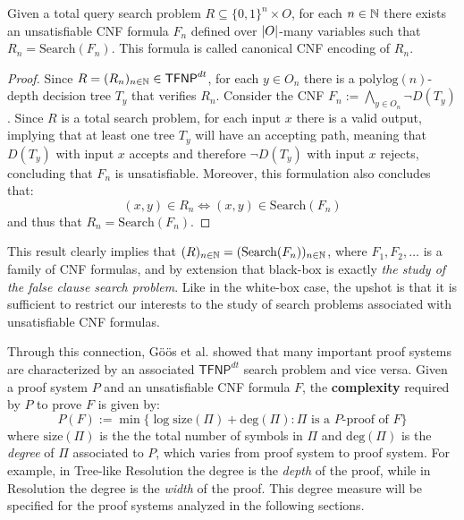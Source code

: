 \begin{proposition}
    \label{Rdt = Search(F)}
 Given a total query search problem $R \subseteq \{0,1\}^n \times O$, for each $n \in \mathbb{N}$ there exists an unsatisfiable CNF formula $F_n$ defined over $\left|O\right|$-many variables such that $R_n = \mathrm{Search}(F_n)$. This formula is called canonical CNF encoding of $R_n$.
\end{proposition}

\begin{proof}
 Since $R = (R_n)_{n \in \mathbb{N}} \in \textsf{TFNP}^{dt}$, for each $y \in O_n$ there is a $\mathrm{polylog}(n)$-depth decision tree $T_y$ that verifies $R_n$. Consider the CNF $F_n := \bigwedge\limits_{y \in O_n} \lnot{D(T_y)}$. Since $R$ is a total search problem, for each input $x$ there is a valid output, implying that at least one tree $T_y$ will have an accepting path, meaning that $D(T_y)$ with input $x$ accepts and therefore $\lnot{D(T_y)}$ with input $x$ rejects, concluding that $F_n$ is unsatisfiable. Moreover, this formulation also concludes that:
    \[(x,y) \in R_n \iff (x,y) \in \mathrm{Search}(F_n)\]
 and thus that $R_n = \mathrm{Search}(F_n)$.

\end{proof}

This result clearly implies that $(R)_{n \in \mathbb{N}} = (\mathrm{Search}(F_n))_{n \in \mathbb{N}}$, where $F_1, F_2, \ldots$ is a family of CNF formulas, and by extension that black-box \TFNP is exactly \textit{the study of the false clause search problem}. Like in the white-box case, the upshot is that it is sufficient to restrict our interests to the study of search problems associated with unsatisfiable CNF formulas.

Through this connection, Göös et al. \cite{adventures_monotone_tfnp} showed that many important proof systems are characterized by an associated $\mathsf{TFNP}^{dt}$ search problem and vice versa. Given a proof system $P$ and an unsatisfiable CNF formula $F$, the \textbf{complexity} required by $P$ to prove $F$ is given by:
\[P(F) := \min\{\log \mathrm{size}(\Pi) + \mathrm{deg}(\Pi) : \Pi \text{ is a $P$-proof of } F\}\]
where $\mathrm{size}(\Pi)$ is the the total number of symbols in $\Pi$ and $\mathrm{deg}(\Pi)$ is the \textit{degree} of $\Pi$ associated to $P$, which varies from proof system to proof system. For example, in Tree-like Resolution the degree is the \textit{depth} of the proof, while in Resolution the degree is the \textit{width} of the proof. This degree measure will be specified for the proof systems analyzed in the following sections.

